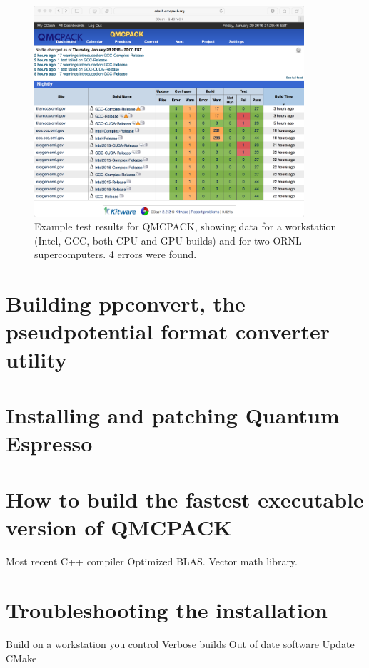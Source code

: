 \begin{figure}
  \centering
  \includegraphics[width=10cm]{figures/QMCPACK_CDash_Ctest_Results_20160129.png}
  \caption{Example test results for QMCPACK, showing data for a
    workstation (Intel, GCC, both CPU and GPU builds) and for two ORNL
    supercomputers. 4 errors were found.}
  \label{fig:cdash}
\end{figure}

\section{Building ppconvert, the pseudpotential format converter
  utility}
\label{sec:buildppconvert}
\section{Installing and patching Quantum Espresso}
\label{sec:buildqe}
\section{How to build the fastest executable version of QMCPACK}
\label{sec:buildperformance}

Most recent C++ compiler
Optimized BLAS. Vector math library.

\section{Troubleshooting the installation}
\label{sec:troubleshoot}
Build on a workstation you control
Verbose builds
Out of date software
Update CMake
